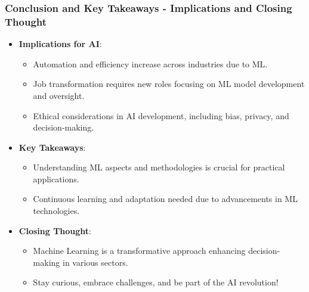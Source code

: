 \documentclass[aspectratio=169]{beamer}
\begin{document}
\begin{frame}[fragile]
    \frametitle{Conclusion and Key Takeaways - Implications and Closing Thought}
    \begin{itemize}
        \item \textbf{Implications for AI}:
            \begin{itemize}
                \item Automation and efficiency increase across industries due to ML.
                \item Job transformation requires new roles focusing on ML model development and oversight.
                \item Ethical considerations in AI development, including bias, privacy, and decision-making.
            \end{itemize}

        \item \textbf{Key Takeaways}:
            \begin{itemize}
                \item Understanding ML aspects and methodologies is crucial for practical applications.
                \item Continuous learning and adaptation needed due to advancements in ML technologies.
            \end{itemize}
        
        \item \textbf{Closing Thought}:
            \begin{itemize}
                \item Machine Learning is a transformative approach enhancing decision-making in various sectors.
                \item Stay curious, embrace challenges, and be part of the AI revolution!
            \end{itemize}
    \end{itemize}
\end{frame}
\end{document}
